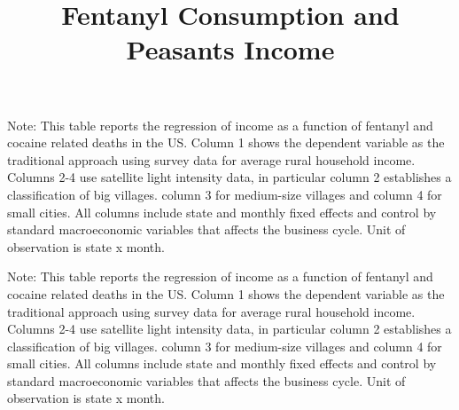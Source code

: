\documentclass[12 pt,fullpage]{article}
\title{\textbf{Fentanyl Consumption and Peasants Income}}
\author{\vspace{-30mm}}
\theoremstyle{plain}
\begin{document}
	\date{\vspace{-25mm}}
	\maketitle
	\vspace{-15mm}



\newpage

\begin{table}[h!]
	\begin{center}
		\scalebox{0.6}{
			}
		\caption{}
	\end{center}
\end{table}
\vspace{-3mm}
\footnotesize Note: This table reports the regression of income as a function of fentanyl and cocaine related deaths in the US. Column 1 shows the dependent variable as the traditional approach using survey data for average rural household income. Columns 2-4 use satellite light intensity data, in particular column 2 establishes a classification of big villages. column 3 for medium-size villages and column 4 for small cities. All columns include state and monthly fixed effects and control by standard macroeconomic variables that affects the business cycle. Unit of observation is state x month. 


\newpage
\begin{table}[h!]
	\begin{center}
		\scalebox{0.6}{
			}
		\caption{}
	\end{center}
\end{table}
\vspace{-3mm}
\footnotesize Note: This table reports the regression of income as a function of fentanyl and cocaine related deaths in the US. Column 1 shows the dependent variable as the traditional approach using survey data for average rural household income. Columns 2-4 use satellite light intensity data, in particular column 2 establishes a classification of big villages. column 3 for medium-size villages and column 4 for small cities. All columns include state and monthly fixed effects and control by standard macroeconomic variables that affects the business cycle. Unit of observation is state x month. 
\end{document}
